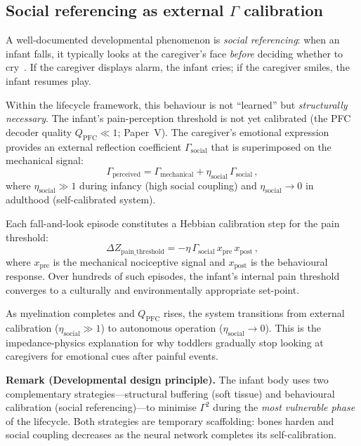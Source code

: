 ﻿\documentclass[aps,pre,twocolumn,superscriptaddress,floatfix]{revtex4-2}
\begin{document}
\subsection{Social referencing as external $\Gamma$ calibration}
\label{sec:social-gamma}

A well-documented developmental phenomenon is
\emph{social referencing}: when an infant falls, it
typically looks at the caregiver's face \emph{before}
deciding whether to cry~\cite{Sorce1985}.
If the caregiver displays alarm, the infant cries;
if the caregiver smiles, the infant resumes play.

Within the lifecycle framework, this behaviour is not
``learned'' but \emph{structurally necessary}.
The infant's pain-perception threshold is not yet
calibrated (the PFC decoder quality
$Q_{\text{PFC}}\ll 1$; Paper~V).
The caregiver's emotional expression provides an
external reflection coefficient $\Gamma_{\text{social}}$
that is superimposed on the mechanical signal:
\begin{equation}
  \Gamma_{\text{perceived}} =
    \Gamma_{\text{mechanical}} +
    \eta_{\text{social}}\,\Gamma_{\text{social}}\,,
  \label{eq:social-gamma}
\end{equation}
where $\eta_{\text{social}}\gg 1$ during infancy
(high social coupling) and
$\eta_{\text{social}}\to 0$ in adulthood
(self-calibrated system).

Each fall-and-look episode constitutes a Hebbian
calibration step for the pain threshold:
\begin{equation}
  \Delta Z_{\text{pain\_threshold}} =
    -\eta\,\Gamma_{\text{social}}\,
    x_{\text{pre}}\,x_{\text{post}}\,,
  \label{eq:social-hebbian}
\end{equation}
where $x_{\text{pre}}$ is the mechanical nociceptive
signal and $x_{\text{post}}$ is the behavioural response.
Over hundreds of such episodes, the infant's internal
pain threshold converges to a culturally and
environmentally appropriate set-point.

As myelination completes and $Q_{\text{PFC}}$ rises,
the system transitions from external calibration
($\eta_{\text{social}}\gg 1$) to autonomous operation
($\eta_{\text{social}}\to 0$).
This is the impedance-physics explanation for why
toddlers gradually stop looking at caregivers for
emotional cues after painful events.

\medskip\noindent\textbf{Remark (Developmental design principle).}
The infant body uses two complementary strategies---structural
buffering (soft tissue) and behavioural calibration (social
referencing)---to minimise $\Gamma^2$ during the
\emph{most vulnerable phase} of the lifecycle.
Both strategies are temporary scaffolding: bones harden
and social coupling decreases as the neural network
completes its self-calibration.
\medskip
\end{document}
